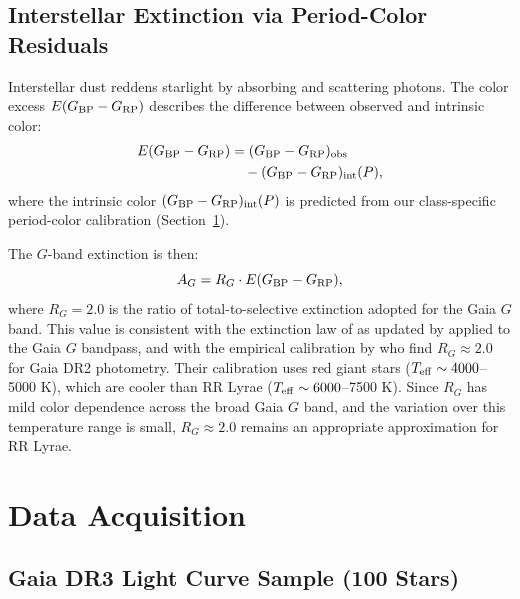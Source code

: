 \documentclass[10pt,preprint2]{aastex}
\begin{document}
\subsection{Interstellar Extinction via Period-Color Residuals}

Interstellar dust reddens starlight by absorbing and scattering photons. The color excess $E(G_{\rm BP} - G_{\rm RP})$ describes the difference between observed and intrinsic color:
\begin{align}
  E(G_{\rm BP} - G_{\rm RP}) &= (G_{\rm BP} - G_{\rm RP})_{\rm obs} \notag \\
                              &\quad - (G_{\rm BP} - G_{\rm RP})_{\rm int}(P),
\end{align}
where the intrinsic color $(G_{\rm BP} - G_{\rm RP})_{\rm int}(P)$ is predicted from our class-specific period-color calibration (Section~\ref{sec:data}).

The $G$-band extinction is then:
\begin{equation}
  A_G = R_G \cdot E(G_{\rm BP} - G_{\rm RP}),
\end{equation}
where $R_G = 2.0$ is the ratio of total-to-selective extinction adopted for the Gaia $G$ band. This value is consistent with the extinction law of \citet{Cardelli1989} as updated by \citet{ODonnell1994} applied to the Gaia $G$ bandpass, and with the empirical calibration by \citet{WangChen2019} who find $R_G \approx 2.0$ for Gaia DR2 photometry. Their calibration uses red giant stars ($T_{\rm eff} \sim 4000$--5000 K), which are cooler than RR Lyrae ($T_{\rm eff} \sim 6000$--7500 K). Since $R_G$ has mild color dependence across the broad Gaia $G$ band, and the variation over this temperature range is small, $R_G \approx 2.0$ remains an appropriate approximation for RR Lyrae.

\section{Data Acquisition}
\label{sec:data}

\subsection{Gaia DR3 Light Curve Sample (100 Stars)}
\end{document}
